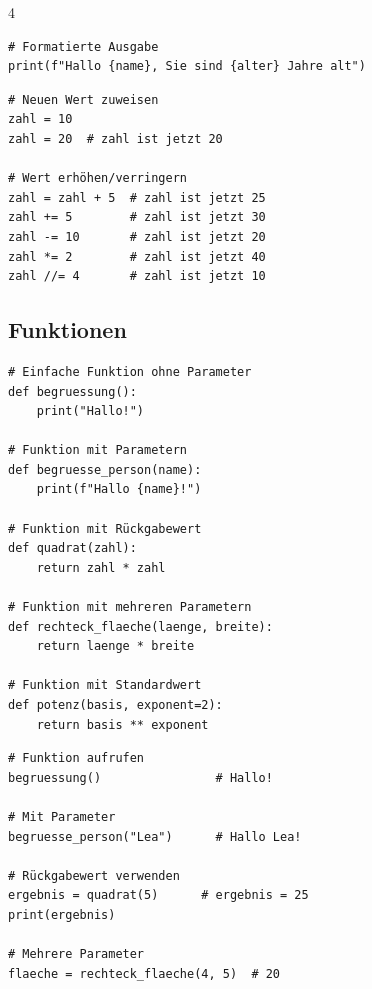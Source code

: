 \begin{landscape}
\begin{multicols*}{4}
\begin{cheatSheetBox}[title=Eingabe und Ausgabe]
\begin{lstlisting}
# Formatierte Ausgabe
print(f"Hallo {name}, Sie sind {alter} Jahre alt")
\end{lstlisting}
		\end{cheatSheetBox}

		\begin{cheatSheetBox}[title=Wert verändern]
			\begin{lstlisting}
# Neuen Wert zuweisen
zahl = 10
zahl = 20  # zahl ist jetzt 20

# Wert erhöhen/verringern
zahl = zahl + 5  # zahl ist jetzt 25
zahl += 5        # zahl ist jetzt 30
zahl -= 10       # zahl ist jetzt 20
zahl *= 2        # zahl ist jetzt 40
zahl //= 4       # zahl ist jetzt 10
\end{lstlisting}
		\end{cheatSheetBox}

		\columnbreak\textcolor{\cheatSheetColor}{\subsection*{Funktionen}}

		\begin{cheatSheetBox}[title=Funktionen definieren]
			\begin{lstlisting}
# Einfache Funktion ohne Parameter
def begruessung():
    print("Hallo!")

# Funktion mit Parametern
def begruesse_person(name):
    print(f"Hallo {name}!")

# Funktion mit Rückgabewert
def quadrat(zahl):
    return zahl * zahl

# Funktion mit mehreren Parametern
def rechteck_flaeche(laenge, breite):
    return laenge * breite

# Funktion mit Standardwert
def potenz(basis, exponent=2):
    return basis ** exponent
\end{lstlisting}
		\end{cheatSheetBox}

		\begin{cheatSheetBox}[title=Funktionen aufrufen]
			\begin{lstlisting}
# Funktion aufrufen
begruessung()                # Hallo!

# Mit Parameter
begruesse_person("Lea")      # Hallo Lea!

# Rückgabewert verwenden
ergebnis = quadrat(5)      # ergebnis = 25
print(ergebnis)

# Mehrere Parameter
flaeche = rechteck_flaeche(4, 5)  # 20


\end{lstlisting}
\end{cheatSheetBox}
\end{multicols*}
\end{landscape}
